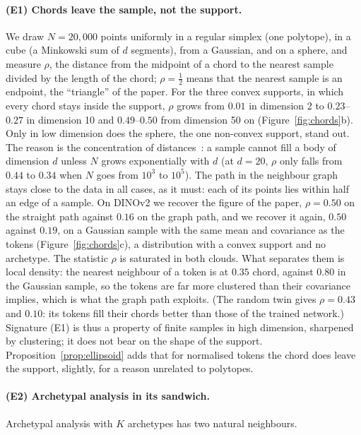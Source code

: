 \documentclass[sigconf,nonacm,screen]{acmart}
\begin{document}
\paragraph{(E1) Chords leave the sample, not the support.} We draw $N=20{,}000$ points uniformly in a
regular simplex (one polytope), in a cube (a Minkowski sum of $d$ segments), from a Gaussian, and on a
sphere, and measure $\rho$, the distance from the midpoint of a chord to the nearest sample divided by
the length of the chord; $\rho=\frac12$ means that the nearest sample is an endpoint, the ``triangle'' of
the paper. For the three convex supports, in which every chord stays inside the support, $\rho$ grows from
$0.01$ in dimension 2 to $0.23$--$0.27$ in dimension 10 and $0.49$--$0.50$ from dimension 50 on
(Figure~\ref{fig:chords}b). Only in low dimension does the sphere, the one non-convex support, stand
out. The reason is the concentration of distances~\cite{beyer1999nearest}: a sample cannot fill a body of
dimension $d$ unless $N$ grows exponentially with $d$ (at $d=20$, $\rho$ only falls from $0.44$ to $0.34$
when $N$ goes from $10^3$ to $10^5$). The path in the neighbour graph stays close to the data in all
cases, as it must: each of its points lies within half an edge of a sample. On DINOv2 we recover the
figure of the paper, $\rho=0.50$ on the straight path against $0.16$ on the graph path, and we recover it
again, $0.50$ against $0.19$, on a Gaussian sample with the same mean and covariance as the tokens
(Figure~\ref{fig:chords}c), a distribution with a convex support and no archetype. The statistic $\rho$
is saturated in both clouds. What separates them is local density: the nearest neighbour of a token is at
$0.35$ chord, against $0.80$ in the Gaussian sample, so the tokens are far more clustered than their
covariance implies, which is what the graph path exploits. (The random twin gives $\rho=0.43$ and
$0.10$: its tokens fill their chords better than those of the trained network.) Signature (E1) is thus a
property of finite samples in high dimension, sharpened by clustering; it does not bear on the shape of
the support. Proposition~\ref{prop:ellipsoid} adds that for normalised tokens the chord does leave the
support, slightly, for a reason unrelated to polytopes.

\paragraph{(E2) Archetypal analysis in its sandwich.} Archetypal analysis with $K$ archetypes has two
natural neighbours.
\end{document}

